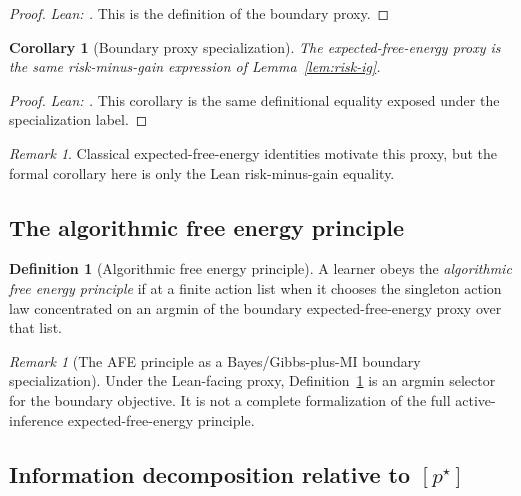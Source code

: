 \documentclass[11pt]{article}
\newtheorem{corollary}[theorem]{Corollary}
\theoremstyle{definition}
\newtheorem{definition}[theorem]{Definition}
\theoremstyle{remark}
\newtheorem{remark}[theorem]{Remark}
\theoremstyle{plain}
\theoremstyle{definition}
\begin{document}
\begin{proof}
\noindent\emph{Lean: .}
This is the definition of the boundary proxy.
\end{proof}

\begin{corollary}[Boundary proxy specialization]
\label{cor:efe-specialization}
The expected-free-energy proxy is the same risk-minus-gain expression of Lemma~\ref{lem:risk-ig}.
\end{corollary}

\begin{proof}
\noindent\emph{Lean: .}
This corollary is the same definitional equality exposed under the specialization label.
\end{proof}

\begin{remark}
\label{rem:efe-unification}
Classical expected-free-energy identities motivate this proxy, but the formal corollary here is only the Lean risk-minus-gain equality.
\end{remark}

\subsection{The algorithmic free energy principle}

\begin{definition}[Algorithmic free energy principle]
\label{def:afe-principle}
A learner obeys the \emph{algorithmic free energy principle} if
at a finite action list when it chooses the singleton action law concentrated on an argmin of the boundary expected-free-energy proxy over that list.
\end{definition}

\begin{remark}[The AFE principle as a Bayes/Gibbs-plus-MI boundary specialization]
\label{rem:afe-as-functional-minimizer}
Under the Lean-facing proxy, Definition~\ref{def:afe-principle} is an argmin selector for the boundary objective. It is not a complete formalization of the full active-inference expected-free-energy principle.
\end{remark}

\subsection{Information decomposition relative to $[p^\star]$}
\end{document}
